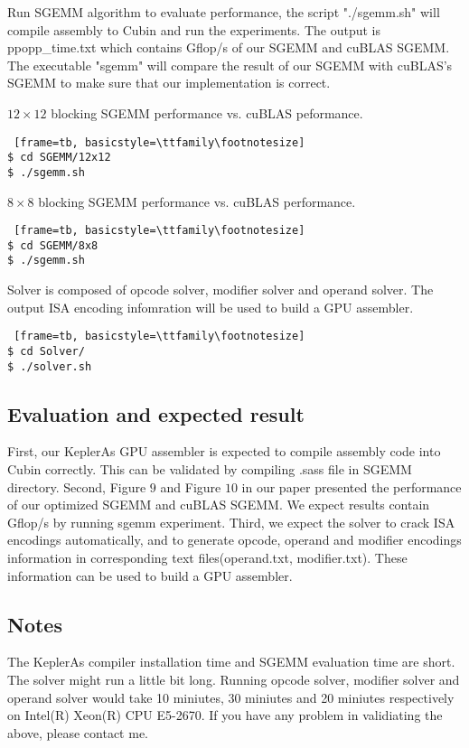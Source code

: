 Run SGEMM algorithm to evaluate performance, the script "./sgemm.sh" will compile assembly to Cubin and run the experiments. The output is ppopp\_time.txt which contains Gflop/s of our SGEMM and cuBLAS SGEMM.
The executable "sgemm" will compare the result of our SGEMM with cuBLAS's SGEMM to make sure that our implementation is correct.

$12\times12$ blocking SGEMM performance vs. cuBLAS peformance.
\begin{lstlisting} [frame=tb, basicstyle=\ttfamily\footnotesize] 
$ cd SGEMM/12x12
$ ./sgemm.sh
\end{lstlisting}

$8\times8$ blocking SGEMM performance vs. cuBLAS performance.
\begin{lstlisting} [frame=tb, basicstyle=\ttfamily\footnotesize] 
$ cd SGEMM/8x8
$ ./sgemm.sh
\end{lstlisting}

Solver is composed of opcode solver, modifier solver and operand solver.
The output ISA encoding infomration will be used to build a GPU assembler.
\begin{lstlisting} [frame=tb, basicstyle=\ttfamily\footnotesize] 
$ cd Solver/
$ ./solver.sh
\end{lstlisting}

\subsection{Evaluation and expected result}
First, our KeplerAs GPU assembler is expected to compile assembly code into Cubin correctly. This can be validated by compiling .sass file in SGEMM directory.
Second, Figure $9$ and Figure $10$ in our paper presented the performance of our optimized SGEMM and cuBLAS SGEMM. We expect results contain Gflop/s by running sgemm experiment. 
Third, we expect the solver to crack ISA encodings automatically, and to generate opcode, operand and modifier encodings information in corresponding text files(operand.txt, modifier.txt). These information can be used to build a GPU assembler.

\subsection{Notes}
The KeplerAs compiler installation time and SGEMM evaluation time are short.
The solver might run a little bit long. Running opcode solver, modifier solver and
operand solver would take 10 miniutes, 30 miniutes and 20 miniutes respectively on
Intel(R) Xeon(R) CPU E5-2670. If you have any problem in validiating the above, please contact me.
